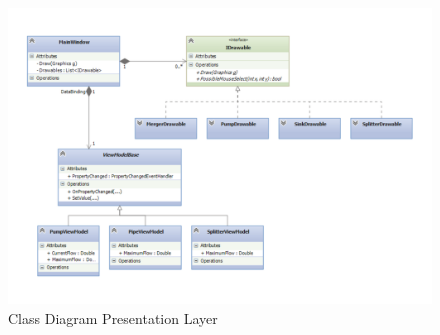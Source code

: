 \begin{figure}
	\centering
	\includegraphics[width=\textwidth]{figures/PresentationOverall.pdf}
	\caption{Class Diagram Presentation Layer}
	\label{fig:presentationoverall}
\end{figure}